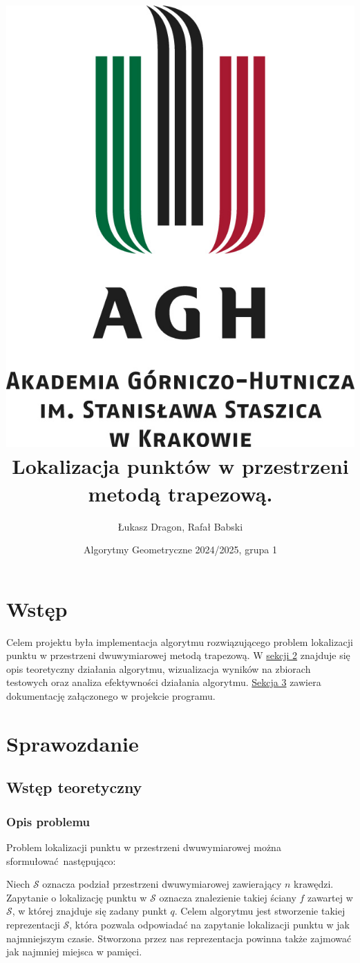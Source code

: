 \documentclass[11pt,a4paper]{article}
\title{
    \includegraphics[scale=0.42]{./res/logos/agh_logo_text_sym.jpg}
    \vfill
    Lokalizacja punktów w przestrzeni
    metodą trapezową.
}
\author{Łukasz Dragon, Rafał Babski}
\date{Algorytmy Geometryczne 2024/2025, grupa 1}
\begin{document}
\maketitle
\tableofcontents
\pagebreak

\section{Wstęp}

Celem projektu była implementacja algorytmu rozwiązującego
problem lokalizacji punktu w przestrzeni dwuwymiarowej 
metodą trapezową. W \hyperlink{section.2}{sekcji 2} znajduje się opis teoretyczny
działania algorytmu, wizualizacja wyników na zbiorach testowych
oraz analiza efektywności działania algorytmu. 
\hyperlink{section.3}{Sekcja 3} zawiera dokumentację załączonego w projekcie programu.

\section{Sprawozdanie}

\subsection{Wstęp teoretyczny}

\subsubsection{Opis problemu}
Problem lokalizacji punktu w przestrzeni dwuwymiarowej
można sformułować następująco:

Niech $\mathscr{S}$ oznacza podział przestrzeni dwuwymiarowej
zawierający $n$ krawędzi. Zapytanie o lokalizację punktu w $\mathscr{S}$
oznacza znalezienie takiej ściany $f$ zawartej w $\mathscr{S}$,
w której znajduje się zadany punkt $q$. Celem algorytmu jest
stworzenie takiej reprezentacji $\mathscr{S}$, która pozwala
odpowiadać na zapytanie lokalizacji punktu w jak najmniejszym
czasie. Stworzona przez nas reprezentacja powinna także 
zajmować jak najmniej miejsca w pamięci.
\end{document}
